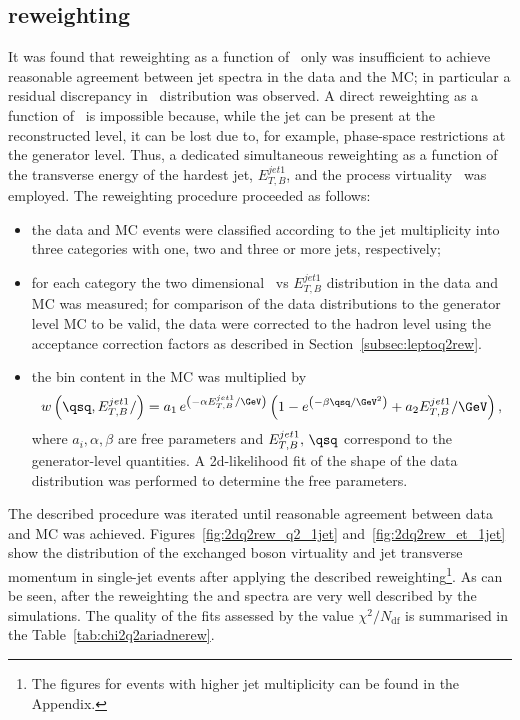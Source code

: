 \subsection{\ariadne reweighting}
\label{subsec:ariadneq2rew}
It was found that reweighting as a function of \qsq~only was insufficient to achieve reasonable agreement between jet spectra in the data and the \ariadne MC; in particular a residual discrepancy in \etjetb~distribution was observed. A direct reweighting as a function of \etjetb~is impossible because, while the jet can be present at the reconstructed level, it can be lost due to, for example, phase-space restrictions at the generator level. Thus, a dedicated simultaneous reweighting as a function of the transverse energy of the hardest jet, $E_{T,B}^{jet1}$, and the process virtuality \qsq~was employed. The reweighting procedure proceeded as follows:
\begin{itemize}
	\item the data and MC events were classified according to the jet multiplicity into three categories with one, two and three or more jets, respectively;
	\item for each category the two dimensional \qsq~vs $E_{T,B}^{jet1}$ distribution in the data and MC was measured; for comparison of the data distributions to the generator level MC to be valid, the data were corrected to the hadron level using the acceptance correction factors as described in Section~\ref{subsec:leptoq2rew}.
	\item the bin content in the MC was multiplied by 
	\begin{equation}
		w\left( \qsq, E_{T,B}^{jet1}/ \right)=a_1\,e^{\left( -\alpha E_{T,B}^{jet1}/\GeV\right) }\left(1- e^{\left( -\beta\qsq/\GeV^2\right) } + a_2 E_{T,B}^{jet1}/\GeV \right),
		\end{equation}
where $a_i, \alpha, \beta$ are free parameters and $E_{T,B}^{jet1},\,\qsq$ correspond to the generator-level quantities. A 2d-likelihood fit of the shape of the data distribution was performed to determine the free parameters.
\end{itemize}
The described procedure was iterated until reasonable agreement between data and MC was achieved. Figures~\ref{fig:2dq2rew_q2_1jet} and~\ref{fig:2dq2rew_et_1jet} show the distribution of the exchanged boson virtuality and jet transverse momentum in single-jet events after applying the described reweighting\footnote{The figures for events with higher jet multiplicity can be found in the Appendix.}. As can be seen, after the reweighting the \qsq and \etjetb spectra are very well described by the simulations. The quality of the fits assessed by the value  $\chi^2/N_\text{df}$ is summarised in the Table~\ref{tab:chi2q2ariadnerew}.

